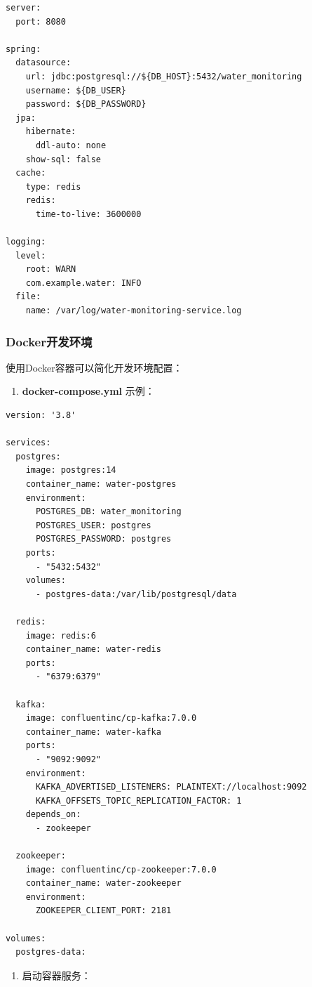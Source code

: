 \begin{lstlisting}
server:
  port: 8080

spring:
  datasource:
    url: jdbc:postgresql://${DB_HOST}:5432/water_monitoring
    username: ${DB_USER}
    password: ${DB_PASSWORD}
  jpa:
    hibernate:
      ddl-auto: none
    show-sql: false
  cache:
    type: redis
    redis:
      time-to-live: 3600000

logging:
  level:
    root: WARN
    com.example.water: INFO
  file:
    name: /var/log/water-monitoring-service.log
\end{lstlisting}

\subsubsection{Docker开发环境}\label{dockerux5f00ux53d1ux73afux5883}

使用Docker容器可以简化开发环境配置：

\begin{enumerate}
\def\labelenumi{\arabic{enumi}.}
\tightlist
\item
  \textbf{docker-compose.yml} 示例：
\end{enumerate}

\begin{lstlisting}
version: '3.8'

services:
  postgres:
    image: postgres:14
    container_name: water-postgres
    environment:
      POSTGRES_DB: water_monitoring
      POSTGRES_USER: postgres
      POSTGRES_PASSWORD: postgres
    ports:
      - "5432:5432"
    volumes:
      - postgres-data:/var/lib/postgresql/data

  redis:
    image: redis:6
    container_name: water-redis
    ports:
      - "6379:6379"

  kafka:
    image: confluentinc/cp-kafka:7.0.0
    container_name: water-kafka
    ports:
      - "9092:9092"
    environment:
      KAFKA_ADVERTISED_LISTENERS: PLAINTEXT://localhost:9092
      KAFKA_OFFSETS_TOPIC_REPLICATION_FACTOR: 1
    depends_on:
      - zookeeper

  zookeeper:
    image: confluentinc/cp-zookeeper:7.0.0
    container_name: water-zookeeper
    environment:
      ZOOKEEPER_CLIENT_PORT: 2181

volumes:
  postgres-data:
\end{lstlisting}

\begin{enumerate}
\def\labelenumi{\arabic{enumi}.}
\setcounter{enumi}{1}
\tightlist
\item
  启动容器服务：
\end{enumerate}

